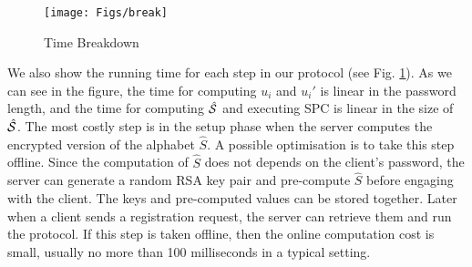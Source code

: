 \begin{figure}[!bp]
\centering
\texttt{[image: Figs/break]}
\caption{Time Breakdown}\label{fig::break}%
\end{figure}

We also show the running time for each step in our protocol (see Fig. \ref{fig::break}). As we can see in the figure, the time for computing $u_i$ and $u_i'$ is linear in the password length, and the time for computing $\hat{\mathcal{S}}$ and executing \ac{SPC} is linear in the size of $\hat{\mathcal{S}}$. The most costly step is in the setup phase when the server computes the encrypted version of the alphabet $\hat{S}$. A possible optimisation is to take this step offline. 
Since the computation of $\hat{S}$ does not depends on the client's password, the server can generate a random RSA key pair and pre-compute $\hat{S}$ before engaging with the client. 
The keys and pre-computed values can be stored together. Later when a client sends a registration request, the server can retrieve them and run the protocol. If this step is taken offline, then the online computation cost is small, usually no more than 100 milliseconds in a typical setting. 
